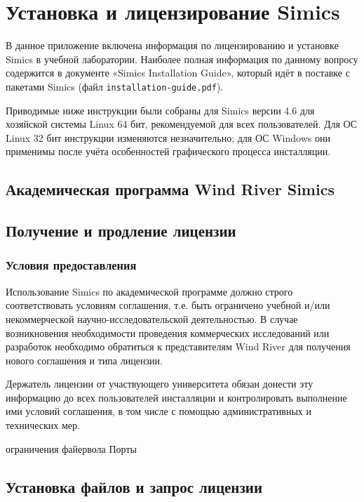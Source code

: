 \chapter{Установка и лицензирование Simics} \label{chap:installation-notes}

В данное приложение включена информация по лицензированию и установке Simics в учебной лаборатории. Наиболее полная информация по данному вопросу содержится в документе «Simics Installation Guide», который идёт в поставке с пакетами Simics (файл  \texttt{installation-guide.pdf}).

Приводимые ниже инструкции были собраны для Simics версии 4.6 для хозяйской системы Linux 64 бит, рекомендуемой для всех пользователей. Для ОС Linux 32 бит инструкции изменяются незначительно; для ОС Windows они применимы после учёта особенностей графического процесса инсталляции.

\section{Академическая программа Wind River Simics}

\todo

\section{Получение и продление лицензии}

\todo

\subsection{Условия предоставления}

Использование Simics по академической программе должно строго соответствовать условиям соглашения, т.е. быть ограничено учебной и/или некоммерческой научно-исследовательской деятельностью. В случае возникновения необходимости проведения коммерческих исследований или разработок необходимо обратиться к представителям Wind River для получения нового соглашения и типа лицензии.

Держатель лицензии от участвующего университета обязан донести эту информацию до всех пользователей инсталляции и контролировать выполнение ими условий соглашения, в том числе с помощью административных и технических мер.

\todo ограничения файервола
\todo Порты

\section{Установка файлов и запрос лицензии}

